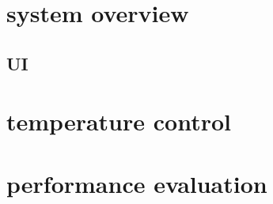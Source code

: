 
\section{system overview}
\subsection{UI}

\section{temperature control}

\section{performance evaluation}



